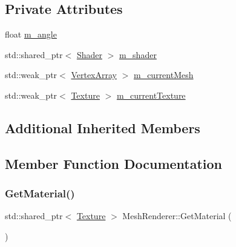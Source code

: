 \subsection*{Private Attributes}
\begin{DoxyCompactItemize}
\item 
float \mbox{\hyperlink{class_disc___engine_1_1_mesh_renderer_af1f330f20f826d459bd9d72e93b3735d}{m\+\_\+angle}}
\item 
std\+::shared\+\_\+ptr$<$ \mbox{\hyperlink{class_disc___engine_1_1_shader}{Shader}} $>$ \mbox{\hyperlink{class_disc___engine_1_1_mesh_renderer_aa15e7dc7474e93fc105bc266340a08ce}{m\+\_\+shader}}
\item 
std\+::weak\+\_\+ptr$<$ \mbox{\hyperlink{class_disc___engine_1_1_vertex_array}{Vertex\+Array}} $>$ \mbox{\hyperlink{class_disc___engine_1_1_mesh_renderer_a961bcd1502e80ef0f5cc6e13ed48a3ca}{m\+\_\+current\+Mesh}}
\item 
std\+::weak\+\_\+ptr$<$ \mbox{\hyperlink{class_disc___engine_1_1_texture}{Texture}} $>$ \mbox{\hyperlink{class_disc___engine_1_1_mesh_renderer_a1c8ae32d9654605b506c3a5722cd517b}{m\+\_\+current\+Texture}}
\end{DoxyCompactItemize}
\subsection*{Additional Inherited Members}


\subsection{Member Function Documentation}
\mbox{\label{class_disc___engine_1_1_mesh_renderer_a7600b0f777f1d63cb3e0302ba637878e}} 
\subsubsection{\texorpdfstring{Get\+Material()}{GetMaterial()}}
{\footnotesize\ttfamily std\+::shared\+\_\+ptr$<$ \mbox{\hyperlink{class_disc___engine_1_1_texture}{Texture}} $>$ Mesh\+Renderer\+::\+Get\+Material (\begin{DoxyParamCaption}{ }\end{DoxyParamCaption})}

